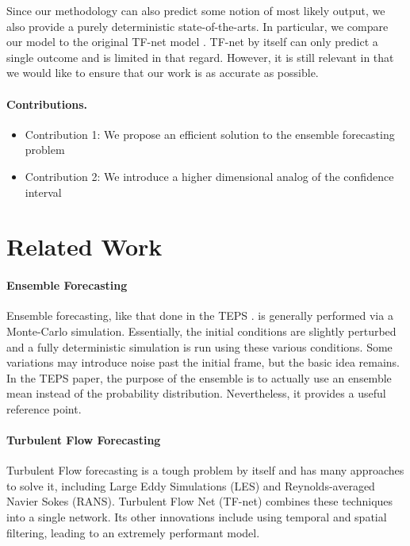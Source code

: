 \documentclass{article}
\begin{document}
    Since our methodology can also predict some notion of most likely output, we also provide a purely deterministic state-of-the-arts. In particular, we compare our model to the original TF-net model \cite{Wang2020TF}. TF-net by itself can only predict a single outcome and is limited in that regard. However, it is still relevant in that we would like to ensure that our work is as accurate as possible.

    \paragraph{Contributions.}
    \begin{itemize}
        \item Contribution 1: We propose an efficient solution to the ensemble forecasting problem
        \item Contribution 2: We introduce a higher dimensional analog of the confidence interval
    \end{itemize}


    \section{Related Work}

    \paragraph{Ensemble Forecasting} Ensemble forecasting, like that done in the TEPS \cite{TyphoonEnsemblePredictionSystemDevelopedattheJapanMeteorologicalAgency}. is generally performed via a Monte-Carlo simulation. Essentially, the initial conditions are slightly perturbed and a fully deterministic simulation is run using these various conditions. Some variations may introduce noise past the initial frame, but the basic idea remains. In the TEPS paper, the purpose of the ensemble is to actually use an ensemble mean instead of the probability distribution. Nevertheless, it provides a useful reference point.

    \paragraph{Turbulent Flow Forecasting} Turbulent Flow forecasting is a tough problem by itself and has many approaches to solve it, including Large Eddy Simulations (LES) and Reynolds-averaged Navier Sokes (RANS). Turbulent Flow Net (TF-net) \cite{Wang2020TF} combines these techniques into a single network. Its other innovations include using temporal and spatial filtering, leading to an extremely performant model.
\end{document}
